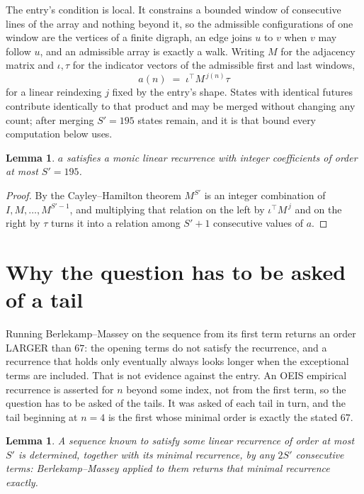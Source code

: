 \documentclass[11pt,a4paper]{article}
\theoremstyle{plain}
\newtheorem{lemma}[theorem]{Lemma}
\theoremstyle{definition}
\begin{document}
The entry's condition is local. It constrains a bounded window of consecutive lines of the
array and nothing beyond it, so the admissible configurations of one window are the vertices of
a finite digraph, an edge joins $u$ to $v$ when $v$ may follow $u$, and an admissible array is
exactly a walk. Writing $M$ for the adjacency matrix and $\iota,\tau$ for the indicator vectors
of the admissible first and last windows,
\[
a(n)\;=\;\iota^{\!\top}M^{\,j(n)}\tau
\]
for a linear reindexing $j$ fixed by the entry's shape. States with identical futures
contribute identically to that product and may be merged without changing any count; after
merging $S'=195$ states remain, and it is that bound every computation below uses.

\begin{lemma}\label{lem:cf}
$a$ satisfies a monic linear recurrence with integer coefficients of order at most $S'=195$.
\end{lemma}

\begin{proof}
By the Cayley--Hamilton theorem $M^{S'}$ is an integer combination of $I,M,\dots,M^{S'-1}$,
and multiplying that relation on the left by $\iota^{\!\top}M^{\,j}$ and on the right by
$\tau$ turns it into a relation among $S'+1$ consecutive values of $a$.
\end{proof}

\section{Why the question has to be asked of a tail}

Running Berlekamp--Massey on the sequence from its first term returns an order LARGER than $67$: the opening terms do not satisfy the recurrence, and a recurrence that holds only eventually always looks longer when the exceptional terms are included. That is not evidence against the entry. An OEIS empirical recurrence is asserted for $n$ beyond some index, not from the first term, so the question has to be asked of the tails. It was asked of each tail in turn, and the tail beginning at $n=4$ is the first whose minimal order is exactly the stated $67$.

\begin{lemma}\label{lem:bm}
A sequence known to satisfy some linear recurrence of order at most $S'$ is determined,
together with its minimal recurrence, by any $2S'$ consecutive terms: Berlekamp--Massey applied
to them returns that minimal recurrence exactly.
\end{lemma}
\end{document}
